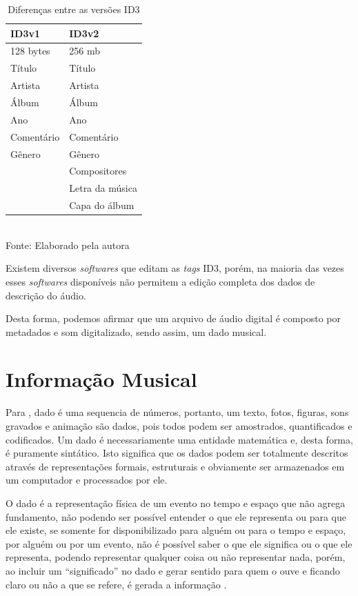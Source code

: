 \begin{table}[ht]
    \centering
    \caption{Diferenças entre as versões ID3}
    \begin{tabular}{|p{4cm}|p{4cm}|}
    \hline
        ID3v1 & ID3v2 \\
    \hline
        128 bytes & 256 mb \\
    \hline
        Título & Título \\
    \hline
        Artista & Artista \\
    \hline
        Álbum & Álbum \\
    \hline
        Ano & Ano \\
    \hline
        Comentário & Comentário \\
    \hline
        Gênero & Gênero \\
    \hline
         & Compositores \\
    \hline
         & Letra da música \\
    \hline
         & Capa do álbum \\
    \hline
    \end{tabular}
    \label{tab:diferencasId3}
    \\Fonte: Elaborado pela autora
\end{table}

Existem diversos \textit{softwares} que editam as \textit{tags} ID3, porém, na maioria das vezes esses \textit{softwares} disponíveis não permitem a edição completa dos dados de descrição do áudio.

Desta forma, podemos afirmar que um arquivo de áudio digital é composto por metadados e som digitalizado, sendo assim, um dado musical.

\section{Informação Musical}
Para , dado é uma sequencia de números, portanto, um texto, fotos, figuras, sons gravados e animação são dados, pois todos podem ser amostrados, quantificados e codificados. Um dado é necessariamente uma entidade matemática e, desta forma, é puramente sintático. Isto significa que os dados podem ser totalmente descritos através de representações formais, estruturais e obviamente ser armazenados em um computador e processados por ele.

O dado é a representação física de um evento no tempo e espaço que não agrega fundamento, não podendo ser possível entender o que ele representa ou para que ele existe, se somente for disponibilizado para alguém ou para o tempo e espaço, por alguém ou por um evento, não é possível saber o que ele significa ou o que ele representa, podendo representar qualquer coisa ou não representar nada, porém, ao incluir um “significado” no dado e gerar sentido para quem o ouve e ficando claro ou não a que se refere, é gerada a informação \cite{rafael2013}.

